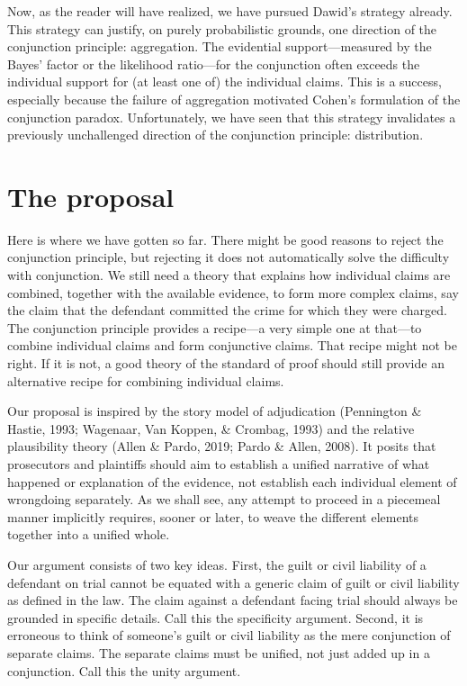 \documentclass[
  10pt,
  dvipsnames,enabledeprecatedfontcommands]{scrartcl}
\begin{document}
Now, as the reader will have realized, we have pursued Dawid's strategy
already. This strategy can justify, on purely probabilistic grounds, one
direction of the conjunction principle: aggregation. The evidential
support---measured by the Bayes' factor or the likelihood ratio---for
the conjunction often exceeds the individual support for (at least one
of) the individual claims. This is a success, especially because the
failure of aggregation motivated Cohen's formulation of the conjunction
paradox. Unfortunately, we have seen that this strategy invalidates a
previously unchallenged direction of the conjunction principle:
distribution.

\hypertarget{the-proposal}{%
\section{The proposal}\label{the-proposal}}

\label{sec:proposal}

Here is where we have gotten so far. There might be good reasons to
reject the conjunction principle, but rejecting it does not
automatically solve the difficulty with conjunction. We still need a
theory that explains how individual claims are combined, together with
the available evidence, to form more complex claims, say the claim that
the defendant committed the crime for which they were charged. The
conjunction principle provides a recipe---a very simple one at that---to
combine individual claims and form conjunctive claims. That recipe might
not be right. If it is not, a good theory of the standard of proof
should still provide an alternative recipe for combining individual
claims.

Our proposal is inspired by the story model of adjudication (Pennington
\& Hastie, 1993; Wagenaar, Van Koppen, \& Crombag, 1993) and the
relative plausibility theory (Allen \& Pardo, 2019; Pardo \& Allen,
2008). It posits that prosecutors and plaintiffs should aim to establish
a unified narrative of what happened or explanation of the evidence, not
establish each individual element of wrongdoing separately. As we shall
see, any attempt to proceed in a piecemeal manner implicitly requires,
sooner or later, to weave the different elements together into a unified
whole.

Our argument consists of two key ideas. First, the guilt or civil
liability of a defendant on trial cannot be equated with a generic claim
of guilt or civil liability as defined in the law. The claim against a
defendant facing trial should always be grounded in specific details.
Call this the specificity argument. Second, it is erroneous to think of
someone's guilt or civil liability as the mere conjunction of separate
claims. The separate claims must be unified, not just added up in a
conjunction. Call this the unity argument.
\end{document}
